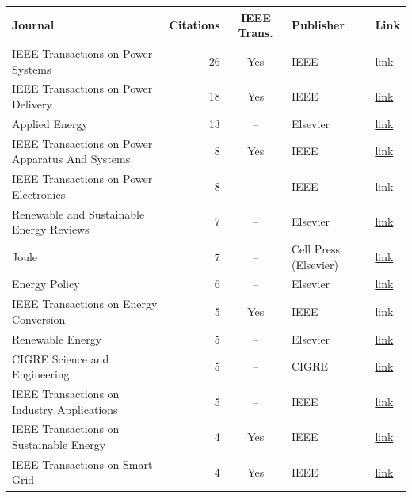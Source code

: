 \begin{table}[htbp]
\centering
\small
\begin{tabular}{lrcll}
\toprule
Journal & Citations & IEEE Trans. & Publisher & Link \\
\midrule
    IEEE Transactions on Power Systems & 26 & Yes & IEEE & \href{https://ieeexplore.ieee.org/xpl/RecentIssue.jsp?punumber=59}{link} \\
    IEEE Transactions on Power Delivery & 18 & Yes & IEEE & \href{https://ieeexplore.ieee.org/xpl/RecentIssue.jsp?punumber=61}{link} \\
    Applied Energy & 13 & -- & Elsevier & \href{https://www.sciencedirect.com/journal/applied-energy}{link} \\
    IEEE Transactions on Power Apparatus And Systems & 8 & Yes & IEEE & \href{https://ieeexplore.ieee.org/xpl/RecentIssue.jsp?punumber=6115846}{link} \\
    IEEE Transactions on Power Electronics & 8 & -- & IEEE & \href{https://ieeexplore.ieee.org/xpl/RecentIssue.jsp?punumber=63}{link} \\
    Renewable and Sustainable Energy Reviews & 7 & -- & Elsevier & \href{https://www.sciencedirect.com/journal/renewable-and-sustainable-energy-reviews}{link} \\
    Joule & 7 & -- & Cell Press (Elsevier) & \href{https://www.cell.com/joule/home}{link} \\
    Energy Policy & 6 & -- & Elsevier & \href{https://www.sciencedirect.com/journal/energy-policy}{link} \\
    IEEE Transactions on Energy Conversion & 5 & Yes & IEEE & \href{https://ieeexplore.ieee.org/xpl/RecentIssue.jsp?punumber=60}{link} \\
    Renewable Energy & 5 & -- & Elsevier & \href{https://www.sciencedirect.com/journal/renewable-energy}{link} \\
    CIGRE Science and Engineering & 5 & -- & CIGRE & \href{https://cse.cigre.org/}{link} \\
    IEEE Transactions on Industry Applications & 5 & -- & IEEE & \href{https://ieeexplore.ieee.org/xpl/RecentIssue.jsp?punumber=28}{link} \\
    IEEE Transactions on Sustainable Energy & 4 & Yes & IEEE & \href{https://ieeexplore.ieee.org/xpl/RecentIssue.jsp?punumber=5165391}{link} \\
    IEEE Transactions on Smart Grid & 4 & Yes & IEEE & \href{https://ieeexplore.ieee.org/xpl/RecentIssue.jsp?punumber=5165411}{link} \\

\end{tabular}
\end{table}

